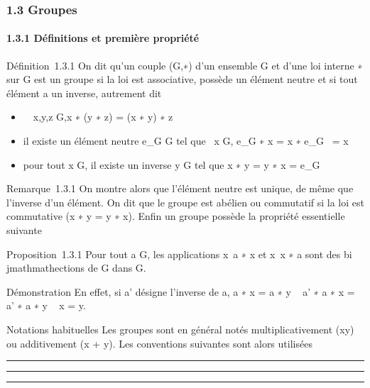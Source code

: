 
\subsubsection{1.3 Groupes}

\paragraph{1.3.1 Définitions et première propriété}

Définition~1.3.1 On dit qu'un couple (G,∗) d'un ensemble G et d'une loi
interne ∗ sur G est un groupe si la loi est associative, possède un
élément neutre et si tout élément a un inverse, autrement dit

\begin{itemize}
\itemsep1pt\parskip0pt
\item
  \forall~~x,y,z \in G,x ∗ (y ∗ z) = (x ∗ y) ∗ z
\item
  il existe un élément neutre e_G \in G tel que
  \forall~x \in G, e_G ∗ x = x ∗ e_G~
  = x
\item
  pour tout x \in G, il existe un inverse y \in G tel que x ∗ y = y ∗ x =
  e_G
\end{itemize}

Remarque~1.3.1 On montre alors que l'élément neutre est unique, de même
que l'inverse d'un élément. On dit que le groupe est abélien ou
commutatif si la loi est commutative (x ∗ y = y ∗ x). Enfin un groupe
possède la propriété essentielle suivante

Proposition~1.3.1 Pour tout a \in G, les applications
x\mapsto~a ∗ x et x\mathrel\mapsto~x ∗ a
sont des bi\\jmathmathections de G dans G.

Démonstration En effet, si a' désigne l'inverse de a, a ∗ x = a ∗ y \rigtharrow~ a'
∗ a ∗ x = a' ∗ a ∗ y \rigtharrow~ x = y.

Notations habituelles Les groupes sont en général notés
multiplicativement (xy) ou additivement (x + y). Les conventions
suivantes sont alors utilisées

\begin{center}\rule{3in}{0.4pt}\end{center}

\begin{center}\rule{3in}{0.4pt}\end{center}

\begin{center}\rule{3in}{0.4pt}\end{center}

